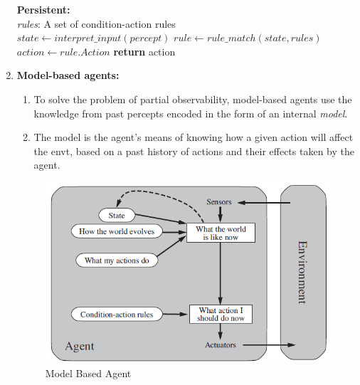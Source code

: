 \documentclass{article}
\theoremstyle{plain}
\theoremstyle{definition}
\begin{document}
\begin{enumerate}
\begin{algorithm}[h]
\begin{algorithmic}[1]
            \State \textbf{Persistent:} \\
            \State  \textit{rules}: A set of condition-action rules\\
            
            \State $state \gets interpret\_input(percept)$
            \State $rule \gets rule\_match(state, rules)$
            \State $action \gets rule.Action$
            \State \textbf{return} action
            \EndProcedure
            
        \end{algorithmic}
        \end{algorithm}

        \item \textbf{Model-based agents:}
        
        \begin{enumerate}
            \item To solve the problem of partial observability, model-based agents use the knowledge from past percepts encoded in the form of an internal \textit{model}.
            
            
            \item The model is the agent's means of knowing how a given action will affect the envt, based on a past history of actions and their effects taken by the agent. 
            
        \end{enumerate}
        
        \begin{figure}[ht]
            \centering
            \includegraphics[scale=0.6]{ml2.png}
            \caption{Model Based Agent}
            \label{fig:my_label_2}
        \end{figure}
        

\end{enumerate}
\end{document}
